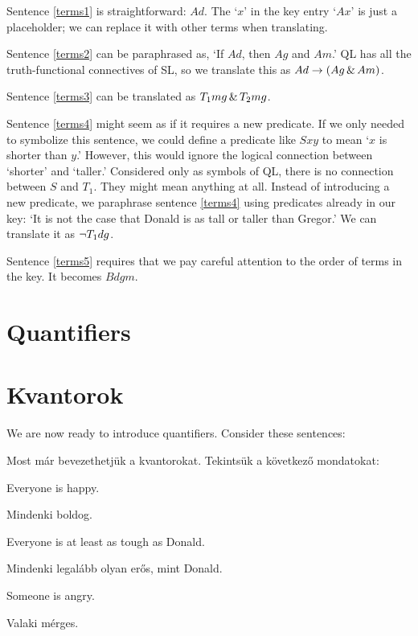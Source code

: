 Sentence \ref{terms1} is straightforward: $Ad$. The `$x$' in the key entry `$Ax$' is just a placeholder; we can replace it with other terms when translating.

Sentence \ref{terms2} can be paraphrased as, `If $Ad$, then $Ag$ and $Am$.' QL has all the truth-functional connectives of SL, so we translate this as $Ad \rightarrow (Ag \,\&\, Am)$.

Sentence \ref{terms3} can be translated as $T_1mg \,\&\, T_2mg$.

Sentence \ref{terms4} might seem as if it requires a new predicate. If we only needed to symbolize this sentence, we could define a predicate like $Sxy$ to mean `$x$ is shorter than $y$.' However, this would ignore the logical connection between `shorter' and `taller.' Considered only as symbols of QL, there is no connection between $S$ and $T_1$. They might mean anything at all. Instead of introducing a new predicate, we paraphrase sentence \ref{terms4} using predicates already in our key: `It is not the case that Donald is as tall or taller than Gregor.' We can translate it as $\neg T_1dg$.

Sentence \ref{terms5} requires that we pay careful attention to the order of terms in the key. It becomes $Bdgm$.





\section{Quantifiers}
\section{Kvantorok}
We are now ready to introduce quantifiers. Consider these sentences:

Most már bevezethetjük a kvantorokat. Tekintsük a következő mondatokat:

\begin{earg}
\item[\ex{q.a}] Everyone is happy.
\item[\ex{q.a}] Mindenki boldog.
\item[\ex{q.ac}] Everyone is at least as tough as Donald.
\item[\ex{q.ac}] Mindenki legalább olyan erős, mint Donald.
\item[\ex{q.e}] Someone is angry.
\item[\ex{q.e}] Valaki mérges.
\end{earg}

